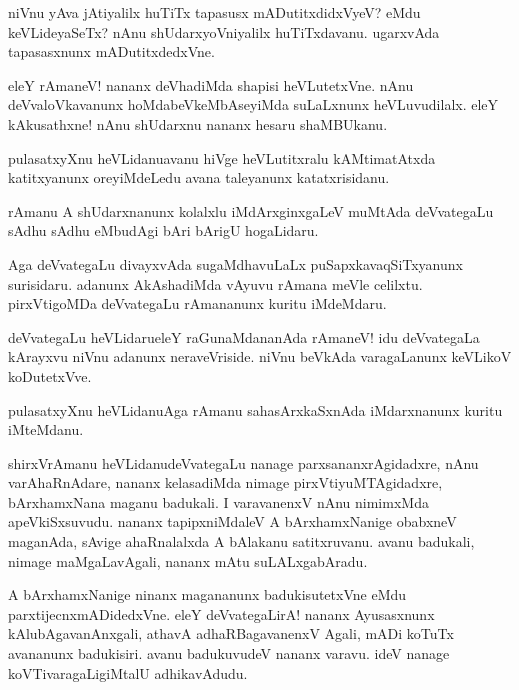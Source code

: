 \begin{mng}
niVnu yAva jAtiyalilx huTiTx tapasusx mADutitxdidxVyeV? eMdu keVLideyaSeTx? nAnu shUdarxyoVniyalilx huTiTxdavanu. ugarxvAda tapasasxnunx mADutitxdedxVne.
\end{mng}

\begin{mng}
eleY rAmaneV! nananx deVhadiMda shapisi heVLutetxVne. nAnu deVvaloVkavanunx hoMdabeVkeMbAseyiMda suLaLxnunx heVLuvudilalx. eleY kAkusathxne! nAnu shUdarxnu nananx hesaru shaMBUkanu.
\end{mng}

\begin{mng}
pulasatxyXnu heVLidanu\mdash avanu hiVge heVLutitxralu kAMtimatAtxda katitxyanunx oreyiMdeLedu avana taleyanunx katatxrisidanu.
\end{mng}

\begin{mng}
rAmanu A shUdarxnanunx kolalxlu iMdArxginxgaLeV muMtAda deVvategaLu sAdhu sAdhu eMbudAgi bAri bArigU hogaLidaru.
\end{mng}

\begin{mng}
Aga deVvategaLu divayxvAda sugaMdhavuLaLx puSapxkavaqSiTxyanunx surisidaru. adanunx AkAshadiMda vAyuvu rAmana meVle celilxtu. pirxVtigoMDa deVvategaLu rAmananunx kuritu iMdeMdaru.
\end{mng}

\begin{mng}
deVvategaLu heVLidaru\mdash eleY raGunaMdananAda rAmaneV! idu deVvategaLa kArayxvu niVnu adanunx neraveVriside. niVnu beVkAda varagaLanunx keVLikoV koDutetxVve.
\end{mng}

\begin{mng}
pulasatxyXnu heVLidanu\mdash Aga rAmanu sahasArxkaSxnAda iMdarxnanunx kuritu iMteMdanu.
\end{mng}

\begin{mng}
shirxVrAmanu heVLidanu\mdash deVvategaLu nanage parxsananxrAgidadxre, nAnu varAhaRnAdare, nananx kelasadiMda nimage pirxVtiyuMTAgidadxre, bArxhamxNana maganu badukali. I varavanenxV nAnu nimimxMda apeVkiSxsuvudu. nananx tapipxniMdaleV A bArxhamxNanige obabxneV maganAda, sAvige ahaRnalalxda A bAlakanu satitxruvanu. avanu badukali, nimage maMgaLavAgali, nananx mAtu suLALxgabAradu.
\end{mng}

\begin{mng}
A bArxhamxNanige ninanx magananunx badukisutetxVne eMdu parxtijecnxmADidedxVne. eleY deVvategaLirA! nananx Ayusasxnunx kAlubAgavanAnxgali, athavA adhaRBagavanenxV Agali, mADi koTuTx avananunx badukisiri. avanu badukuvudeV nananx varavu. ideV nanage koVTivaragaLigiMtalU adhikavAdudu.
\end{mng}

